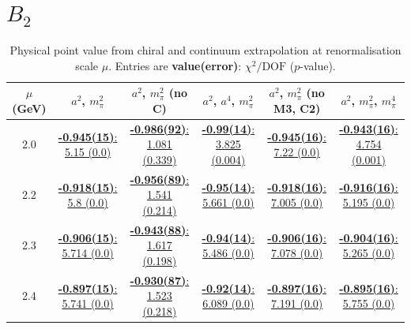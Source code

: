 \documentclass[12pt]{extarticle}
\begin{document}
\section{$B_2$}
\begin{table}[h!]
\begin{center}
\begin{tabular}{|c|c|c|c|c|c|}
\hline
$\mu$ (GeV) & $a^2$, $m_\pi^2$& $a^2$, $m_\pi^2$ (no C)& $a^2$, $a^4$, $m_\pi^2$& $a^2$, $m_\pi^2$ (no M3, C2)& $a^2$, $m_\pi^2$, $m_\pi^4$\\
\hline
2.0& \hyperlink{VVmAA/SUSY/a2m2_20.pdf.1}{\textbf{-0.945(15)}: 5.15 (0.0)} & \hyperlink{VVmAA/SUSY/a2m2noC_20.pdf.1}{\textbf{-0.986(92)}: 1.081 (0.339)} & \hyperlink{VVmAA/SUSY/a2a4m2_20.pdf.1}{\textbf{-0.99(14)}: 3.825 (0.004)} & \hyperlink{VVmAA/SUSY/a2m2mcut_20.pdf.1}{\textbf{-0.945(16)}: 7.22 (0.0)} & \hyperlink{VVmAA/SUSY/a2m2m4_20.pdf.1}{\textbf{-0.943(16)}: 4.754 (0.001)}\\
2.2& \hyperlink{VVmAA/SUSY/a2m2_22.pdf.1}{\textbf{-0.918(15)}: 5.8 (0.0)} & \hyperlink{VVmAA/SUSY/a2m2noC_22.pdf.1}{\textbf{-0.956(89)}: 1.541 (0.214)} & \hyperlink{VVmAA/SUSY/a2a4m2_22.pdf.1}{\textbf{-0.95(14)}: 5.661 (0.0)} & \hyperlink{VVmAA/SUSY/a2m2mcut_22.pdf.1}{\textbf{-0.918(16)}: 7.005 (0.0)} & \hyperlink{VVmAA/SUSY/a2m2m4_22.pdf.1}{\textbf{-0.916(16)}: 5.195 (0.0)}\\
2.3& \hyperlink{VVmAA/SUSY/a2m2_23.pdf.1}{\textbf{-0.906(15)}: 5.714 (0.0)} & \hyperlink{VVmAA/SUSY/a2m2noC_23.pdf.1}{\textbf{-0.943(88)}: 1.617 (0.198)} & \hyperlink{VVmAA/SUSY/a2a4m2_23.pdf.1}{\textbf{-0.94(14)}: 5.486 (0.0)} & \hyperlink{VVmAA/SUSY/a2m2mcut_23.pdf.1}{\textbf{-0.906(16)}: 7.078 (0.0)} & \hyperlink{VVmAA/SUSY/a2m2m4_23.pdf.1}{\textbf{-0.904(16)}: 5.265 (0.0)}\\
2.4& \hyperlink{VVmAA/SUSY/a2m2_24.pdf.1}{\textbf{-0.897(15)}: 5.741 (0.0)} & \hyperlink{VVmAA/SUSY/a2m2noC_24.pdf.1}{\textbf{-0.930(87)}: 1.523 (0.218)} & \hyperlink{VVmAA/SUSY/a2a4m2_24.pdf.1}{\textbf{-0.92(14)}: 6.089 (0.0)} & \hyperlink{VVmAA/SUSY/a2m2mcut_24.pdf.1}{\textbf{-0.897(16)}: 7.191 (0.0)} & \hyperlink{VVmAA/SUSY/a2m2m4_24.pdf.1}{\textbf{-0.895(16)}: 5.755 (0.0)}\\
\hline
\end{tabular}
\caption{Physical point value from chiral and continuum extrapolation at renormalisation scale $\mu$. Entries are \textbf{value(error)}: $\chi^2/\text{DOF}$ ($p$-value).}
\end{center}
\end{table}
\end{document}
